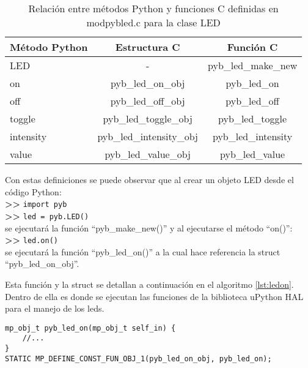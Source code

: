 \begin{table}[h]
	\centering
	\caption[Relación entre métodos Python y funciones C]{Relación entre métodos Python y funciones C definidas en modpybled.c para la clase LED}
	\begin{tabular}{l c c}    
		\toprule
		\textbf{Método Python} 	 & \textbf{Estructura C} & \textbf{Función C}  \\
		\midrule
		LED	 				& - 												& pyb\_led\_make\_new \\	
		on	 				& pyb\_led\_on\_obj 				& pyb\_led\_on 					\\		
		off 	 			& pyb\_led\_off\_obj 				& pyb\_led\_off					\\
		toggle	 		& pyb\_led\_toggle\_obj 		& pyb\_led\_toggle			\\
		intensity	 	& pyb\_led\_intensity\_obj 	& pyb\_led\_intensity		\\
		value	 			& pyb\_led\_value\_obj 			&	pyb\_led\_value 			\\
		\bottomrule
		\hline
	\end{tabular}
	\label{tab:methfn}
\end{table}

Con estas definiciones se puede observar que al crear un objeto LED desde el código Python:\\
\textbf{{\fontsize{16}{16}\selectfont \textgreater\textgreater}} \texttt{import pyb}\\
\textbf{{\fontsize{16}{16}\selectfont \textgreater\textgreater}} \texttt{led = pyb.LED()}\\
se ejecutará la función “pyb\_make\_new()” y al ejecutarse el método “on()”:\\
\textbf{{\fontsize{16}{16}\selectfont \textgreater\textgreater}} \texttt{led.on()}\\
se ejecutará la función “pyb\_led\_on()” a la cual hace referencia la struct “pyb\_led\_on\_obj”.

Esta función y la struct se detallan a continuación en el algoritmo \ref{lst:ledon}. Dentro de ella es donde se ejecutan las funciones de la biblioteca uPython HAL para el manejo de los leds.

\begin{lstlisting}[label={lst:ledon},caption=Función que se ejecuta al invocar el método on().] 
mp_obj_t pyb_led_on(mp_obj_t self_in) {
    //...
}
STATIC MP_DEFINE_CONST_FUN_OBJ_1(pyb_led_on_obj, pyb_led_on);
\end{lstlisting}

